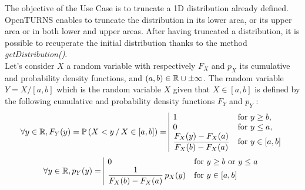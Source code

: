 \renewcommand{\filename}{docUC_InputNoData_TruncatedDist.tex}
\renewcommand{\filetitle}{UC : Creation of a truncated distribution}

\HeaderIIILevel
\label{truncatedistribution}





The objective of the Use Case is to truncate a 1D distribution already defined. OpenTURNS enables to truncate the distribution in its lower area, or its upper area or in both lower and upper areas. After having  truncated a distribution, it is possible to recuperate the initial distribution thanks to the method {\itshape getDistribution()}.\\

Let's consider $X$ a random variable with respectively $F_X$ and $p_X$ its cumulative and probability density functions, and $(a,b)\in {\mathbb R} \cup {\pm \infty}$. The random variable $Y=X/[a,b]$ which is the random variable $X$ given that $X\in[a,b]$ is defined by the following cumulative and probability density functions $F_Y$ and $p_Y$ :
\begin{align*}
  \forall y \in {\mathbb R}, F_Y(y) = {\mathbb P}\left( X<y\, / \, X\in[a,b] \right) =
  \begin{array}{|ll}
    1 & \mbox{for } y \geq b, \\
    0 & \mbox{for } y \leq a, \\
    \displaystyle \frac{F_X(y) - F_X(a)}{F_X(b) - F_X(a)} & \mbox{for } y\in[a,b]
  \end{array}
\end{align*}
\begin{align*}
  \forall y \in {\mathbb R}, p_Y(y) =
  \begin{array}{|ll}
    0 &  \mbox{for } y \geq b  \mbox{ or }  y \leq a\\
    \displaystyle \frac{1}{F_X(b) - F_X(a)}\, p_X(y) & \mbox{for } y\in[a,b]
  \end{array}
\end{align*}





